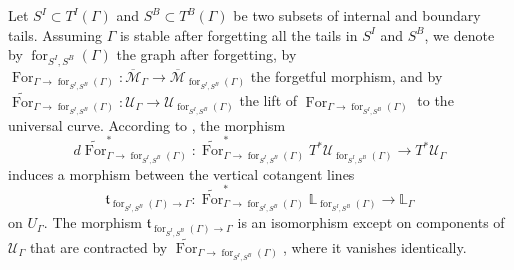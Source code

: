 \documentclass[11pt]{amsart}
\theoremstyle{definition}
\theoremstyle{remark}
\renewcommand{\for}{\operatorname{for}}
\newcommand{\For}{\operatorname{For}}
\newcommand{\<}{\left<}
\renewcommand{\>}{\right>}
\numberwithin{equation}{section}
\def\Mbar{{\overline{\mathcal M}}}
\begin{document}
Let $S^I\subset T^I(\Gamma)$ and $S^B\subset T^B(\Gamma)$ be two subsets of internal and boundary tails. Assuming $\Gamma$ is stable after forgetting all the tails in $S^I$ and $S^B$, we denote by $\for_{{S^I,S^B}}(\Gamma)$ the graph after forgetting, by $\For_{\Gamma \to \for_{{S^I,S^B}}(\Gamma)}\colon \Mbar_\Gamma\to \Mbar_{\for_{{S^I,S^B}}(\Gamma)}$ the forgetful morphism, and by $\widetilde{\For}_{\Gamma \to \for_{{S^I,S^B}}(\Gamma)}\colon \mathcal U_{\Gamma} \to \mathcal U_{\for_{{S^I,S^B}}(\Gamma)}$ the lift of $\For_{\Gamma \to \for_{{S^I,S^B}}(\Gamma)}$ to the universal curve. According to \cite[\S3.5]{PST14}, the morphism 
$$d\widetilde{\For}^*_{\Gamma \to \for_{{S^I,S^B}}(\Gamma)}\colon \widetilde{\For}_{\Gamma \to \for_{{S^I,S^B}}(\Gamma)}^*T^*\mathcal U_{\for_{{S^I,S^B}}(\Gamma)}\to T^*\mathcal U_{\Gamma}$$ induces a morphism between the vertical cotangent lines $$\mathfrak t_{\for_{{S^I,S^B}}(\Gamma)\to \Gamma}\colon \widetilde{\For}_{\Gamma\to \for_{{S^I,S^B}}(\Gamma)}^*\mathbb L_{\for_{{S^I,S^B}}(\Gamma)}\to \mathbb L_{\Gamma}$$
on $U_{\Gamma}$.
The morphism $\mathfrak t_{\for_{{S^I,S^B}}(\Gamma)\to\Gamma}$ is an isomorphism except %
on components of %
$\mathcal U_{\Gamma}$ that are contracted by $\widetilde{\For}_{\Gamma \to \for_{{S^I,S^B}}(\Gamma)}$, where it vanishes identically. 
\end{document}
